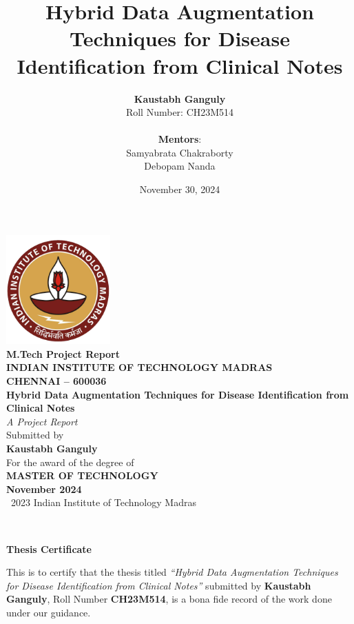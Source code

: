 \documentclass[12pt,a4paper]{report}
\title{\textbf{Hybrid Data Augmentation Techniques for Disease Identification from Clinical Notes}}
\author{
    \textbf{Kaustabh Ganguly} \\
    Roll Number: CH23M514 \\
    \\
    \textbf{Mentors}: \\
    Samyabrata Chakraborty \\
    Debopam Nanda \\
}
\date{November 30, 2024}
\begin{document}
\begin{titlepage}
    \centering
    \includegraphics[width=4cm]{logo.png} \\
    \vspace{0.5cm}
    {\large \bfseries M.Tech Project Report\\
    INDIAN INSTITUTE OF TECHNOLOGY MADRAS \\
    CHENNAI -- 600036} \\
    \vspace{1.5cm}
    {\huge \bfseries Hybrid Data Augmentation Techniques for Disease Identification from Clinical Notes} \\
    \vspace{2cm}
    {\Large \textit{A Project Report}} \\
    \vspace{0.5cm}
    {\large Submitted by} \\
    \vspace{0.5cm}
    {\Large \bfseries Kaustabh Ganguly} \\
    \vspace{0.5cm}
    {\large For the award of the degree of} \\
    \vspace{0.5cm}
    {\Large \bfseries MASTER OF TECHNOLOGY} \\
    \vspace{1.5cm}
    {\large \bfseries November 2024} \\
    \vfill
    {\small \textcopyright~2023 Indian Institute of Technology Madras}
\end{titlepage}

\newpage
~\vfill
\begin{center}
    \textbf{Thesis Certificate}
\end{center}
\vspace{0.5in}
This is to certify that the thesis titled \textit{``Hybrid Data Augmentation Techniques for Disease Identification from Clinical Notes''} submitted by \textbf{Kaustabh Ganguly}, Roll Number \textbf{CH23M514}, is a bona fide record of the work done under our guidance. \\
\end{document}
